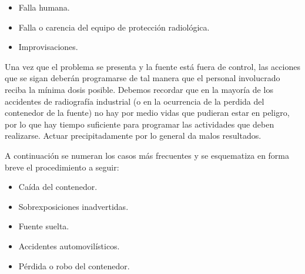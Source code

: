 \begin{itemize}
    \item Falla humana.
    \item Falla o carencia del equipo de protección radiológica.
    \item Improvisaciones.
\end{itemize}

Una vez que el problema se presenta y la fuente está fuera de control, las acciones que se sigan deberán programarse de tal manera que el personal involucrado reciba la mínima dosis posible. Debemos recordar que en la mayoría de los accidentes de radiografía industrial (o en la ocurrencia de la perdida del contenedor de la fuente) no hay por medio vidas que pudieran estar en peligro, por lo que hay tiempo suficiente para programar las actividades que deben realizarse. Actuar precipitadamente por lo general da malos resultados.

A continuación se numeran los casos más frecuentes y se esquematiza en forma breve el procedimiento a seguir:

\begin{itemize}
    \item Caída del contenedor.
    \item Sobrexposiciones inadvertidas.
    \item Fuente suelta.
    \item Accidentes automovilísticos.
    \item Pérdida o robo del contenedor.
\end{itemize}
